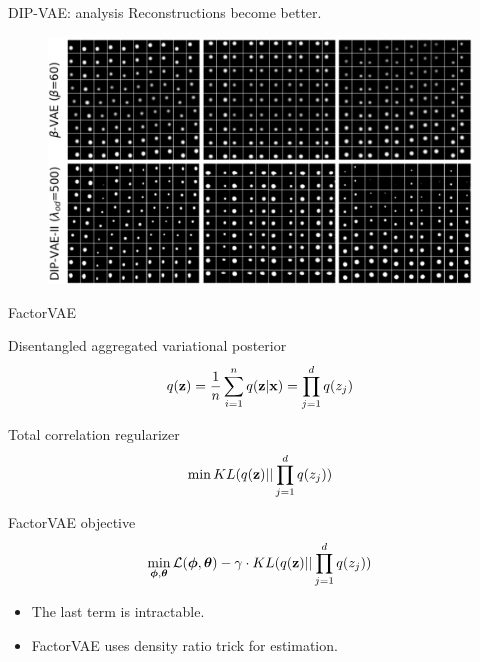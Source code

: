 \begin{frame}{DIP-VAE: analysis}
	Reconstructions become better.
	\begin{figure}
		\centering
		\includegraphics[width=\linewidth]{figs/dip-vae_1}
	\end{figure}
	
\end{frame}
\begin{frame}{FactorVAE}
	\begin{block}{Disentangled aggregated variational posterior}
		\vspace{-0.3cm}
		\[
			q(\mathbf{z}) = \frac{1}{n} \sum_{i=1}^n q(\mathbf{z} | \mathbf{x}) = \prod_{j=1}^d q(z_j)
		\]
		\vspace{-0.3cm}
	\end{block}
	\begin{block}{Total correlation regularizer}
		\vspace{-0.3cm}
		\[
		\min KL(q(\mathbf{z}) || \prod_{j=1}^d q(z_j))
		\]
		\vspace{-0.3cm}
	\end{block}
	\begin{block}{FactorVAE objective}
		\vspace{-0.3cm}
		\[
		\min_{\boldsymbol{\phi}, \boldsymbol{\theta}} \mathcal{L}(\boldsymbol{\phi}, \boldsymbol{\theta}) - \gamma \cdot KL(q(\mathbf{z}) || \prod_{j=1}^d q(z_j))
		\]
		\vspace{-0.3cm}
	\end{block}
	\begin{itemize}
		\item The last term is intractable.
		\item FactorVAE uses density ratio trick for estimation. 
	\end{itemize}

\end{frame}
